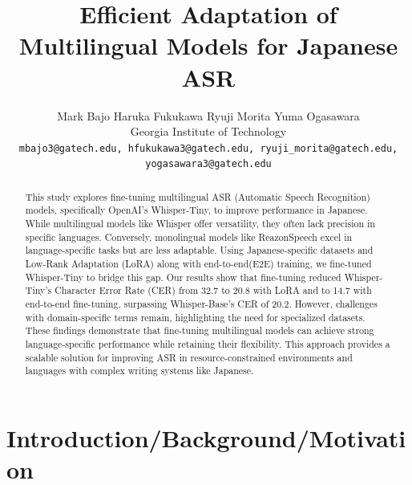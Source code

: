 \documentclass[10pt,twocolumn,letterpaper]{article}
\begin{document}


\title{Efficient Adaptation of Multilingual Models for Japanese ASR}

\author{
Mark Bajo \quad Haruka Fukukawa \quad Ryuji Morita \quad Yuma Ogasawara\\
Georgia Institute of Technology\\
\tt\small mbajo3@gatech.edu, hfukukawa3@gatech.edu, ryuji\_morita@gatech.edu, yogasawara3@gatech.edu\\
}

\maketitle

\begin{abstract}
This study explores fine-tuning multilingual ASR (Automatic Speech Recognition) models, specifically OpenAI’s Whisper-Tiny, to improve performance in Japanese. While multilingual models like Whisper offer versatility, they often lack precision in specific languages. Conversely, monolingual models like ReazonSpeech excel in language-specific tasks but are less adaptable. Using Japanese-specific datasets and Low-Rank Adaptation (LoRA) along with end-to-end(E2E) training, we fine-tuned Whisper-Tiny to bridge this gap. Our results show that fine-tuning reduced Whisper-Tiny’s Character Error Rate (CER) from 32.7 to 20.8 with LoRA and to 14.7 with end-to-end fine-tuning, surpassing Whisper-Base’s CER of 20.2. However, challenges with domain-specific terms remain, highlighting the need for specialized datasets. These findings demonstrate that fine-tuning multilingual models can achieve strong language-specific performance while retaining their flexibility. This approach provides a scalable solution for improving ASR in resource-constrained environments and languages with complex writing systems like Japanese.
\end{abstract}

\section{Introduction/Background/Motivation}
\end{document}
